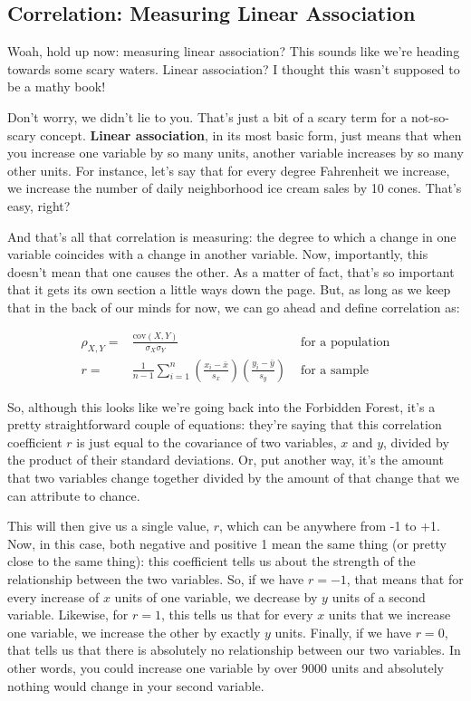 \subsection{Correlation: Measuring Linear Association}
Woah, hold up now: measuring linear association? This sounds like we're heading towards some scary waters. Linear association? I thought this wasn't supposed to be a mathy book!

Don't worry, we didn't lie to you. That's just a bit of a scary term for a not-so-scary concept. \textbf{Linear association}, in its most basic form, just means that when you increase one variable by so many units, another variable increases by so many other units. For instance, let's say that for every degree Fahrenheit we increase, we increase the number of daily neighborhood ice cream sales by 10 cones. That's easy, right?

And that's all that correlation is measuring: the degree to which a change in one variable coincides with a change in another variable. Now, importantly, this doesn't mean that one causes the other. As a matter of fact, that's so important that it gets its own section a little ways down the page. But, as long as we keep that in the back of our minds for now, we can go ahead and define correlation as:

\begin{eqnarray}
\rho_{X,Y} =& \frac{\text{cov}(X,Y)}{\sigma_X\sigma_Y} &\text{ for a population} \\
r=& \frac{1}{n-1}\sum_{i=1}^n\left(\frac{x_i-\bar{x}}{s_x}\right)\left(\frac{y_i-\bar{y}}{s_y}\right) &\text{ for a sample}
\end{eqnarray}

So, although this looks like we're going back into the Forbidden Forest, it's a pretty straightforward couple of equations: they're saying that this correlation coefficient \(r\) is just equal to the covariance of two variables, \(x\) and \(y\), divided by the product of their standard deviations. Or, put another way, it's the amount that two variables change together divided by the amount of that change that we can attribute to chance.

This will then give us a single value, \(r\), which can be anywhere from -1 to +1. Now, in this case, both negative and positive 1 mean the same thing (or pretty close to the same thing): this coefficient tells us about the strength of the relationship between the two variables. So, if we have \(r=-1\), that means that for every increase of \(x\) units of one variable, we decrease by \(y\) units of a second variable. Likewise, for \(r=1\), this tells us that for every \(x\) units that we increase one variable, we increase the other by exactly \(y\) units. Finally, if we have \(r=0\), that tells us that there is absolutely no relationship between our two variables. In other words, you could increase one variable by over 9000 units and absolutely nothing would change in your second variable.

